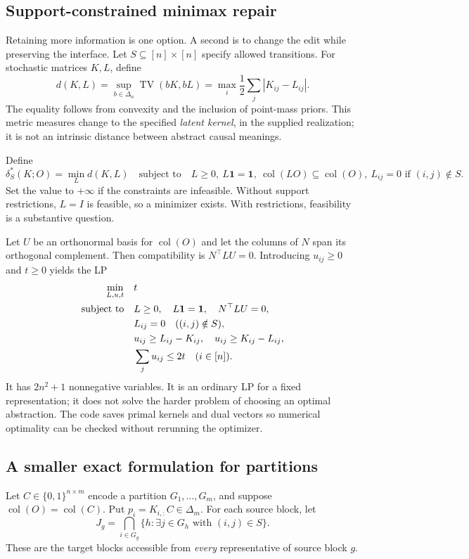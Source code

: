 \documentclass[11pt,letterpaper]{article}
\newcommand{\one}{\mathbf{1}}
\newcommand{\TV}{\operatorname{TV}}
\newcommand{\col}{\operatorname{col}}
\newcommand{\D}{\Delta}
\begin{document}
\subsection{Support-constrained minimax repair}
Retaining more information is one option. A second is to change the edit while preserving the interface. Let $S\subseteq[n]\times[n]$ specify allowed transitions. For stochastic matrices $K,L$, define
\begin{equation}
d(K,L)=\sup_{b\in\D_n}\TV(bK,bL)
       =\max_i\frac12\sum_j|K_{ij}-L_{ij}|.\label{eq:distance}
\end{equation}
The equality follows from convexity and the inclusion of point-mass priors. This metric measures change to the specified \emph{latent kernel}, in the supplied realization; it is not an intrinsic distance between abstract causal meanings.

Define
\begin{equation}
\delta^*_S(K;O)=\min_L d(K,L)\quad\text{subject to}\quad
L\ge0,\ L\one=\one,\ \col(LO)\subseteq\col(O),\ L_{ij}=0\text{ if }(i,j)\notin S.\label{eq:repair}
\end{equation}
Set the value to $+\infty$ if the constraints are infeasible. Without support restrictions, $L=I$ is feasible, so a minimizer exists. With restrictions, feasibility is a substantive question.

Let $U$ be an orthonormal basis for $\col(O)$ and let the columns of $N$ span its orthogonal complement. Then compatibility is $N^\top L U=0$. Introducing $u_{ij}\ge0$ and $t\ge0$ yields the LP
\begin{align}
\min_{L,u,t}\quad&t\\
\text{subject to}\quad&L\ge0,\quad L\one=\one,\quad N^\top L U=0,\notag\\
&L_{ij}=0\quad ((i,j)\notin S),\notag\\
&u_{ij}\ge L_{ij}-K_{ij},\quad u_{ij}\ge K_{ij}-L_{ij},\notag\\
&\sum_j u_{ij}\le2t\quad (i\in[n]).\label{eq:lp}
\end{align}
It has $2n^2+1$ nonnegative variables. It is an ordinary LP for a fixed representation; it does not solve the harder problem of choosing an optimal abstraction. The code saves primal kernels and dual vectors so numerical optimality can be checked without rerunning the optimizer.

\subsection{A smaller exact formulation for partitions}
Let $C\in\{0,1\}^{n\times m}$ encode a partition $G_1,\ldots,G_m$, and suppose $\col(O)=\col(C)$. Put $p_i=K_{i,:}C\in\D_m$. For each source block, let
\begin{equation}
J_g=\bigcap_{i\in G_g}\{h:\exists j\in G_h\text{ with }(i,j)\in S\}.
\end{equation}
These are the target blocks accessible from \emph{every} representative of source block $g$.
\end{document}
